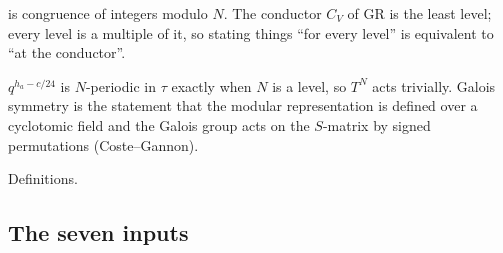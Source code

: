 \begin{dictionary}
\lean{[ZMOD N]} is congruence of integers modulo $N$. The conductor $C_V$ of GR is the least level; every
level is a multiple of it, so stating things ``for every level'' is equivalent to ``at the conductor''.
\end{dictionary}

\begin{physics}
$q^{h_a-c/24}$ is $N$-periodic in $\tau$ exactly when $N$ is a level, so $T^N$ acts trivially. Galois symmetry
is the statement that the modular representation is defined over a cyclotomic field and the Galois group acts on
the $S$-matrix by signed permutations (Coste--Gannon).
\end{physics}

\begin{status}
Definitions.
\end{status}

\subsection{The seven inputs}


